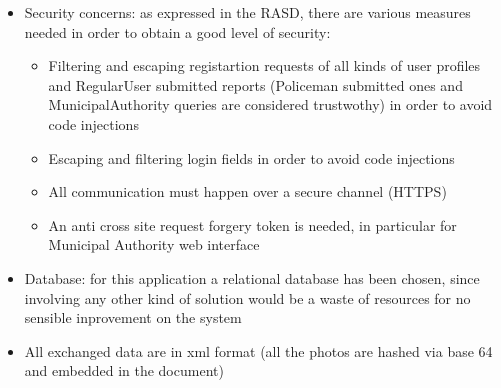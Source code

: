 \begin{itemize}
	\item Security concerns: as expressed in the RASD, there are various measures needed in order to obtain a good level of security:
	\begin{itemize}
		\item Filtering and escaping registartion requests of all kinds of user profiles and RegularUser submitted reports (Policeman submitted ones and MunicipalAuthority queries are considered trustwothy) in order to avoid code injections
		\item Escaping and filtering login fields in order to avoid code injections
		\item All communication must happen over a secure channel (HTTPS)
		\item An anti cross site request forgery token is needed, in particular for Municipal Authority web interface
	\end{itemize}
	
	\item Database: for this application a relational database has been chosen, since involving any other kind of solution would be a waste of resources for no sensible inprovement on the system
	
	\item All exchanged data are in xml format (all the photos are hashed via base 64 and embedded in the document)
\end{itemize}